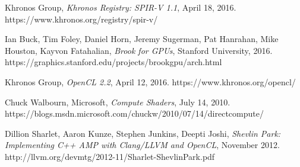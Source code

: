 \begin{thebibliography}{99}

	Khronos Group,
	\emph{Khronos Registry: SPIR-V 1.1},
	April 18, 2016.
	https://www.khronos.org/registry/spir-v/

  Ian Buck, Tim Foley, Daniel Horn, Jeremy Sugerman, Pat Hanrahan, Mike Houston, Kayvon Fatahalian,
  \emph{Brook for GPUs},
  Stanford University,
  2016.
  https://graphics.stanford.edu/projects/brookgpu/arch.html

	Khronos Group,
	\emph{OpenCL 2.2},
	April 12, 2016.
	https://www.khronos.org/opencl/

	Chuck Walbourn, Microsoft,
	\emph{Compute Shaders},
	July 14, 2010.
	https://blogs.msdn.microsoft.com/chuckw/2010/07/14/directcompute/

	Dillion Sharlet, Aaron Kunze, Stephen Junkins, Deepti Joshi,
	\emph{Shevlin Park: Implementing C++ AMP with Clang/LLVM and OpenCL},
	November 2012.
	http://llvm.org/devmtg/2012-11/Sharlet-ShevlinPark.pdf

\end{thebibliography}